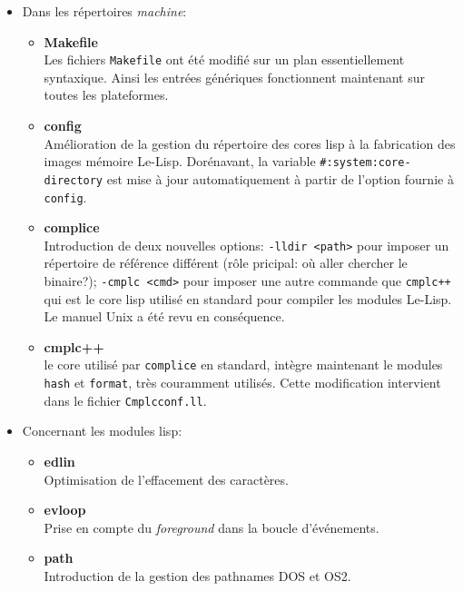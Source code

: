 
\begin {itemize}

\item Dans les r\'{e}pertoires {\it machine}:
\begin {itemize}
\item {\bf Makefile}\\
Les fichiers {\tt Makefile} ont \'{e}t\'{e} modifi\'{e} sur un plan
essentiellement syntaxique. Ainsi les entr\'{e}es g\'{e}n\'{e}riques
fonctionnent maintenant sur toutes les plateformes.

\item {\bf config}\\
Am\'{e}lioration de la gestion du r\'{e}pertoire des cores lisp \`{a} la
fabrication des images m\'{e}moire Le-Lisp.
Dor\'{e}navant, la variable {\tt \#:system:core-directory} est mise
\`{a} jour automatiquement \`{a} partir de l'option fournie \`{a} {\tt config}.

\item {\bf complice}\\
Introduction de deux nouvelles options: {\tt -lldir <path>} pour
imposer un r\'{e}pertoire de r\'{e}f\'{e}rence diff\'{e}rent (r\^{o}le pricipal: o\`{u}
aller chercher le binaire?); {\tt -cmplc <cmd>}
pour imposer une autre commande que {\tt cmplc++} qui est le core lisp
utilis\'{e} en standard pour compiler les modules Le-Lisp. Le manuel Unix
a \'{e}t\'{e} revu en cons\'{e}quence. 

\item {\bf cmplc++}\\
le core utilis\'{e} par {\tt complice} en standard, int\`{e}gre maintenant
le modules {\tt hash} et {\tt format}, tr\`{e}s couramment utilis\'{e}s.
Cette modification intervient dans le fichier {\tt Cmplcconf.ll}.
\end{itemize}

\item Concernant les modules lisp:
\begin{itemize}
\item {\bf edlin}\\
Optimisation de l'effacement des caract\`{e}res.

\item {\bf evloop}\\
Prise en compte du {\it foreground} dans la boucle d'\'{e}v\'{e}nements.

\item {\bf path}\\
Introduction de la gestion des pathnames DOS et OS2.


\end{itemize}
\end{itemize}
